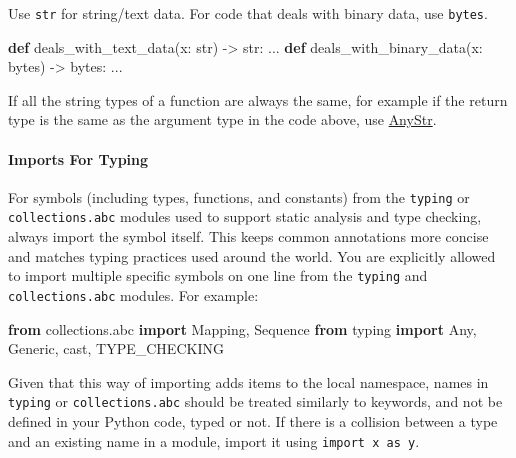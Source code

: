 \documentclass[
]{article}
\newenvironment{Shaded}{}{}
\newcommand{\BuiltInTok}[1]{\textcolor[rgb]{0.00,0.50,0.00}{#1}}
\newcommand{\ImportTok}[1]{\textcolor[rgb]{0.00,0.50,0.00}{\textbf{#1}}}
\newcommand{\KeywordTok}[1]{\textcolor[rgb]{0.00,0.44,0.13}{\textbf{#1}}}
\newcommand{\NormalTok}[1]{#1}
\newcommand{\OperatorTok}[1]{\textcolor[rgb]{0.40,0.40,0.40}{#1}}
\begin{document}
Use \texttt{str} for string/text data. For code that deals with binary
data, use \texttt{bytes}.

\begin{samepage}
\begin{Shaded}
\begin{Highlighting}[]
\KeywordTok{def}\NormalTok{ deals\_with\_text\_data(x: }\BuiltInTok{str}\NormalTok{) }\OperatorTok{{-}\textgreater{}} \BuiltInTok{str}\NormalTok{:}
\NormalTok{  ...}
\KeywordTok{def}\NormalTok{ deals\_with\_binary\_data(x: }\BuiltInTok{bytes}\NormalTok{) }\OperatorTok{{-}\textgreater{}} \BuiltInTok{bytes}\NormalTok{:}
\NormalTok{  ...}
\end{Highlighting}
\end{Shaded}
\end{samepage}

If all the string types of a function are always the same, for example
if the return type is the same as the argument type in the code above,
use \hyperref[typing-type-var]{AnyStr}.

\paragraph{Imports For Typing}

For symbols (including types, functions, and constants) from the
\texttt{typing} or \texttt{collections.abc} modules used to support
static analysis and type checking, always import the symbol itself. This
keeps common annotations more concise and matches typing practices used
around the world. You are explicitly allowed to import multiple specific
symbols on one line from the \texttt{typing} and
\texttt{collections.abc} modules. For example:

\begin{samepage}
\begin{Shaded}
\begin{Highlighting}[]
\ImportTok{from}\NormalTok{ collections.abc }\ImportTok{import}\NormalTok{ Mapping, Sequence}
\ImportTok{from}\NormalTok{ typing }\ImportTok{import}\NormalTok{ Any, Generic, cast, TYPE\_CHECKING}
\end{Highlighting}
\end{Shaded}
\end{samepage}

Given that this way of importing adds items to the local namespace,
names in \texttt{typing} or \texttt{collections.abc} should be treated
similarly to keywords, and not be defined in your Python code, typed or
not. If there is a collision between a type and an existing name in a
module, import it using \texttt{import\ x\ as\ y}.
\end{document}
